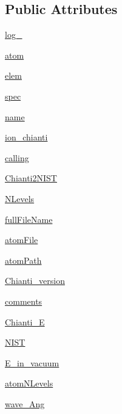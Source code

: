\subsection*{Public Attributes}
\begin{DoxyCompactItemize}
\item 
\hyperlink{classpyneb_1_1utils_1_1pn__chianti_1_1___atom_chianti_a949f340c2041435c590ca066e2797e7d}{log\-\_\-}
\item 
\hyperlink{classpyneb_1_1utils_1_1pn__chianti_1_1___atom_chianti_a168acbb7ea238fb41299616a512d487c}{atom}
\item 
\hyperlink{classpyneb_1_1utils_1_1pn__chianti_1_1___atom_chianti_abe30b15c08f41bbb5c548c197977293a}{elem}
\item 
\hyperlink{classpyneb_1_1utils_1_1pn__chianti_1_1___atom_chianti_a12c7570333087fefa72763dd77a81379}{spec}
\item 
\hyperlink{classpyneb_1_1utils_1_1pn__chianti_1_1___atom_chianti_a7471c40b97108627573a9814cde6feec}{name}
\item 
\hyperlink{classpyneb_1_1utils_1_1pn__chianti_1_1___atom_chianti_a97865c9f8fcd274072335cc71fc746a3}{ion\-\_\-chianti}
\item 
\hyperlink{classpyneb_1_1utils_1_1pn__chianti_1_1___atom_chianti_af0303fd3e5fd4db39d3d1cdf62b2e4bc}{calling}
\item 
\hyperlink{classpyneb_1_1utils_1_1pn__chianti_1_1___atom_chianti_af40dabefe9f067611af9696725412980}{Chianti2\-N\-I\-S\-T}
\item 
\hyperlink{classpyneb_1_1utils_1_1pn__chianti_1_1___atom_chianti_ab23fbd744cdeaa1e09454f014db040dc}{N\-Levels}
\item 
\hyperlink{classpyneb_1_1utils_1_1pn__chianti_1_1___atom_chianti_ac091a3412fff7c4af350dbbe6b604082}{full\-File\-Name}
\item 
\hyperlink{classpyneb_1_1utils_1_1pn__chianti_1_1___atom_chianti_acf53db82cf11ffa5218615522a69dff2}{atom\-File}
\item 
\hyperlink{classpyneb_1_1utils_1_1pn__chianti_1_1___atom_chianti_aaf24255765203c5d7650a7e7fc0f888d}{atom\-Path}
\item 
\hyperlink{classpyneb_1_1utils_1_1pn__chianti_1_1___atom_chianti_a56253efc79815d86493f5753ff9c5b72}{Chianti\-\_\-version}
\item 
\hyperlink{classpyneb_1_1utils_1_1pn__chianti_1_1___atom_chianti_afebb1605835d41af3a3078038475913a}{comments}
\item 
\hyperlink{classpyneb_1_1utils_1_1pn__chianti_1_1___atom_chianti_ad3eb8ed7f4cb58a7806dd820b22f3d37}{Chianti\-\_\-\-E}
\item 
\hyperlink{classpyneb_1_1utils_1_1pn__chianti_1_1___atom_chianti_a1e879cf028a221b9ce7908eabf570641}{N\-I\-S\-T}
\item 
\hyperlink{classpyneb_1_1utils_1_1pn__chianti_1_1___atom_chianti_a0f18a10053d8b91b233a17e586760326}{E\-\_\-in\-\_\-vacuum}
\item 
\hyperlink{classpyneb_1_1utils_1_1pn__chianti_1_1___atom_chianti_a785ebfaa736f8db0aa4755a0447da689}{atom\-N\-Levels}
\item 
\hyperlink{classpyneb_1_1utils_1_1pn__chianti_1_1___atom_chianti_aca46b2e32f9bc1412824ea3998fbe97f}{wave\-\_\-\-Ang}
\end{DoxyCompactItemize}
